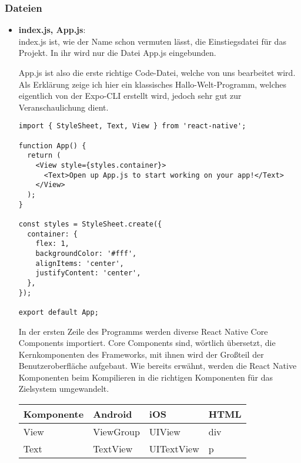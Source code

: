 \subsubsection{Dateien}

\begin{itemize}
\item \textbf{index.js, App.js}:\\
index.js ist, wie der Name schon vermuten lässt, die Einstiegsdatei für das Projekt. In ihr wird
nur die Datei App.js eingebunden.

App.js ist also die erste richtige Code-Datei, welche von uns bearbeitet wird. Als Erklärung zeige
ich hier ein klassisches Hallo-Welt-Programm, welches eigentlich von der Expo-CLI erstellt wird,
jedoch sehr gut zur Veranschaulichung dient.

\begin{lstlisting}
import { StyleSheet, Text, View } from 'react-native';

function App() {
  return (
    <View style={styles.container}>
      <Text>Open up App.js to start working on your app!</Text>
    </View>
  );
}

const styles = StyleSheet.create({
  container: {
    flex: 1,
    backgroundColor: '#fff',
    alignItems: 'center',
    justifyContent: 'center',
  },
});

export default App;
\end{lstlisting}

In der ersten Zeile des Programms werden diverse React Native Core Components importiert. Core
Components sind, wörtlich übersetzt, die Kernkomponenten des Frameworks, mit ihnen wird der Großteil
der Benutzeroberfläche aufgebaut. Wie bereits erwähnt, werden die React Native Komponenten beim
Kompilieren in die richtigen Komponenten für das Zielsystem umgewandelt.

\begin{table}[H]
\centering
\begin{tabular}{|l|l|l|l|}
  \hline
  \textbf{Komponente} & \textbf{Android} & \textbf{iOS} & \textbf{HTML} \\ \hline\hline
  View                & ViewGroup        & UIView       & div          \\
  Text                & TextView         & UITextView   & p            \\ \hline
\end{tabular}
\end{table}


\end{itemize}
